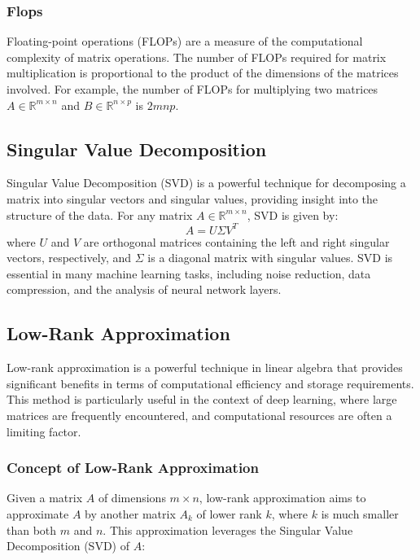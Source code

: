     \subsubsection{Flops}
    Floating-point operations (FLOPs) are a measure of the computational complexity of matrix operations. The number of FLOPs required for matrix multiplication is proportional to the product of the dimensions of the matrices involved. For example, the number of FLOPs for multiplying two matrices $A \in \mathbb{R}^{m \times n}$ and $B \in \mathbb{R}^{n \times p}$ is $2mnp$.

\subsection{Singular Value Decomposition}
    Singular Value Decomposition (SVD) is a powerful technique for decomposing a matrix into singular vectors and singular values, providing insight into the structure of the data. For any matrix $A \in \mathbb{R}^{m \times n}$, SVD is given by:
    \begin{equation}
        A = U\Sigma V^T
        \label{eq:svd}
    \end{equation}
    where $U$ and $V$ are orthogonal matrices containing the left and right singular vectors, respectively, and $\Sigma$ is a diagonal matrix with singular values. SVD is essential in many machine learning tasks, including noise reduction, data compression, and the analysis of neural network layers.

\subsection{Low-Rank Approximation}

    Low-rank approximation is a powerful technique in linear algebra that provides significant benefits in terms of computational efficiency and storage requirements. This method is particularly useful in the context of deep learning, where large matrices are frequently encountered, and computational resources are often a limiting factor.
    
    \subsubsection{Concept of Low-Rank Approximation}
    
    Given a matrix $A$ of dimensions $m \times n$, low-rank approximation aims to approximate $A$ by another matrix $A_k$ of lower rank $k$, where $k$ is much smaller than both $m$ and $n$. This approximation leverages the Singular Value Decomposition (SVD) of $A$:
    
